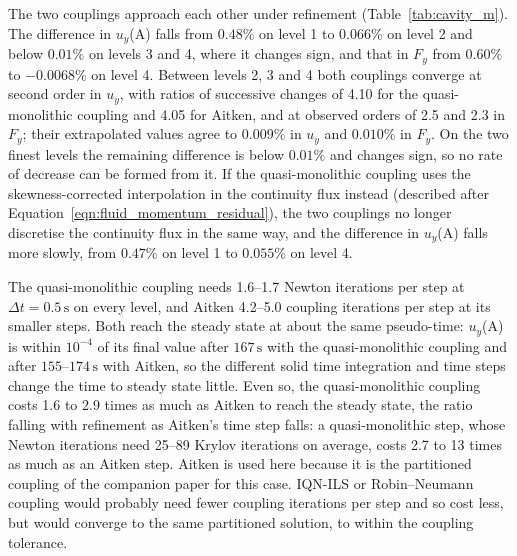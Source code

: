 The two couplings approach each other under refinement (Table~\ref{tab:cavity_m}).
The difference in $u_y$(A) falls from $0.48\%$ on level 1 to $0.066\%$ on level 2 and below $0.01\%$ on levels 3 and 4, where it changes sign, and that in $F_y$ from $0.60\%$ to $-0.0068\%$ on level 4.
Between levels 2, 3 and 4 both couplings converge at second order in $u_y$, with ratios of successive changes of 4.10 for the quasi-monolithic coupling and 4.05 for Aitken, and at observed orders of 2.5 and 2.3 in $F_y$; their extrapolated values agree to $0.009\%$ in $u_y$ and $0.010\%$ in $F_y$.
On the two finest levels the remaining difference is below $0.01\%$ and changes sign, so no rate of decrease can be formed from it.
If the quasi-monolithic coupling uses the skewness-corrected interpolation in the continuity flux instead (described after Equation~\eqref{eqn:fluid_momentum_residual}), the two couplings no longer discretise the continuity flux in the same way, and the difference in $u_y$(A) falls more slowly, from $0.47\%$ on level 1 to $0.055\%$ on level 4.

The quasi-monolithic coupling needs 1.6--1.7 Newton iterations per step at $\Delta t = 0.5\,\mathrm{s}$ on every level, and Aitken 4.2--5.0 coupling iterations per step at its smaller steps.
Both reach the steady state at about the same pseudo-time: $u_y$(A) is within $10^{-4}$ of its final value after $167\,\mathrm{s}$ with the quasi-monolithic coupling and after $155$--$174\,\mathrm{s}$ with Aitken, so the different solid time integration and time steps change the time to steady state little.
Even so, the quasi-monolithic coupling costs 1.6 to 2.9 times as much as Aitken to reach the steady state, the ratio falling with refinement as Aitken's time step falls: a quasi-monolithic step, whose Newton iterations need 25--89 Krylov iterations on average, costs 2.7 to 13 times as much as an Aitken step.
Aitken is used here because it is the partitioned coupling of the companion paper for this case.
IQN-ILS or Robin--Neumann coupling would probably need fewer coupling iterations per step and so cost less, but would converge to the same partitioned solution, to within the coupling tolerance.

